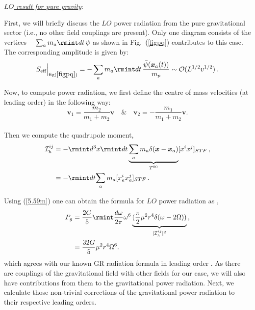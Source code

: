\underline{\textit{{$LO$ result for pure gravity}}}:

First, we will briefly discuss the $LO$ power radiation from the pure gravitational sector (i.e., no other field couplings are present).  Only one diagram consists of the vertices $-\sum_a m_a\rmint dt\,\psi$ as shown in Fig.~(\ref{figpq}) contributes to this case. The corresponding amplitude is given by: 
\begin{align}
    \begin{split}
S_{\text{eff}}\Big|_{{\text{fig}(\ref{figpq})}}=-\sum_{a}m_a\rmint dt\, \frac{\Bar{\psi}(\boldsymbol{x}_a(t))}{m_p}\sim\mathcal{O}(L^{1/2}v^{1/2})\,.
    \end{split}
\end{align}


Now, to compute power radiation, we first define the centre of mass velocities (at leading order) in the following way: $$\boldsymbol{v}_1=\frac{m_2}{m_1+m_2} \boldsymbol{v}\quad \& \quad \boldsymbol{v}_2=-\frac{m_1}{m_1+m_2}  \boldsymbol{v}.$$\\

Then we compute the quadrupole moment,
\begin{align}
\begin{split}
   \mathcal{I}^{ij}_h&=-\rmint d^3 x\rmint dt\underbrace{\sum_a m_a\delta(\boldsymbol{x}-\boldsymbol{x}_a)}_{T^{00}}[x^ix^j]_{STF}\,,\\&
    =-\rmint dt{\sum_a m_a}[x_a^ix_a^j]_{STF}\,.\label{5.59m}
\end{split}
\end{align}
\vspace{-0.1cm}

Using (\ref{5.59m}) one can obtain the formula for $LO$ power radiation as ,
\begin{align}
\begin{split}
{P}_g&=\frac{2G}{5}\rmint \frac{d\omega}{2\pi}\omega^6\underbrace{(\frac{\pi}{2}\mu^2r^4\delta(\omega-2\Omega))}_{|\mathcal{I}^{ij}_h|^2}\,,\\&
=\frac{32G}{5}\mu^2r^4\Omega^6.
\end{split}
\end{align}
which agrees with our known GR radiation formula in leading order \cite{2009GReGr..41.1667H}. As there are couplings of the gravitational field with other fields for our case, we will also have contributions from them to the gravitational power radiation. Next, we calculate those non-trivial corrections of the gravitational power radiation to their respective leading orders.



